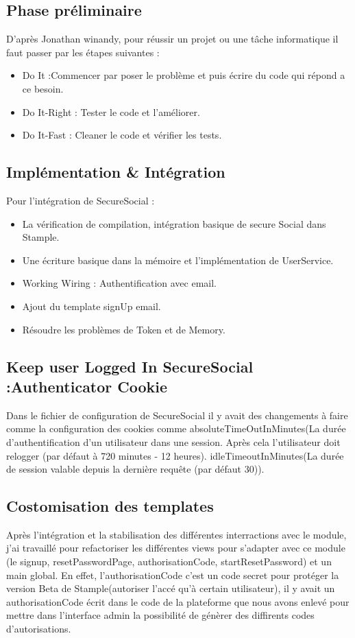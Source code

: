 \documentclass[12pt,oneside,a4paper]{article}
\begin{document}
\subsection{Phase préliminaire}
D'après Jonathan winandy, pour réussir un projet ou une tâche informatique il faut passer par les étapes suivantes :
\begin{itemize}

\item Do It :Commencer par poser le problème et puis écrire du code qui répond a ce besoin.  
\item Do It-Right : Tester le code et l'améliorer.
\item Do It-Fast : Cleaner le code et vérifier les tests.
\end{itemize}
\subsection{Implémentation \& Intégration}

Pour l'intégration de SecureSocial :
\begin{itemize}
\item La vérification de compilation, intégration basique de secure Social dans Stample.
\item Une écriture basique dans la mémoire et l'implémentation de UserService.
\item Working Wiring : Authentification avec email.
\item Ajout du template signUp email.
\item Résoudre les problèmes de Token et de Memory.
\end{itemize}
\subsection{Keep user Logged In SecureSocial :Authenticator Cookie}
Dans le fichier de configuration de SecureSocial il y avait des changements à faire comme la configuration des cookies comme absoluteTimeOutInMinutes(La durée d'authentification d'un utilisateur dans une session. Après cela l'utilisateur doit relogger (par défaut à 720 minutes - 12 heures).
idleTimeoutInMinutes(La durée de session valable depuis la dernière requête (par défaut 30)).
\subsection{Costomisation des templates}
Après l'intégration et la stabilisation des différentes interractions avec le module, j'ai travaillé pour refactoriser les différentes views pour s'adapter avec ce module (le signup, resetPasswordPage, authorisationCode, startResetPassword) et un main global.
En effet, l'authorisationCode c'est un code secret pour protéger la version Beta de Stample(autoriser l'accé qu'à certain utilisateur), il y avait un authorisationCode écrit dans le code de la plateforme que nous avons enlevé pour mettre dans l'interface admin la possibilité de génèrer des diffirents codes d'autorisations.
\end{document}
